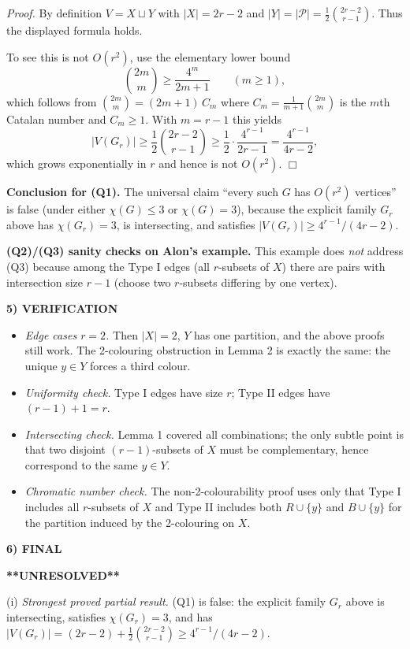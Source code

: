 \noindent\emph{Proof.}
By definition $V=X\sqcup Y$ with $|X|=2r-2$ and $|Y|=|\mathcal P|=\frac12\binom{2r-2}{r-1}$.
Thus the displayed formula holds.

To see this is not $O(r^2)$, use the elementary lower bound
\[
\binom{2m}{m}\ge \frac{4^m}{2m+1}\qquad(m\ge 1),
\]
which follows from $\binom{2m}{m}=(2m+1)\,C_m$ where $C_m=\frac{1}{m+1}\binom{2m}{m}$ is the $m$th Catalan number and $C_m\ge 1$.
With $m=r-1$ this yields
\[
|V(G_r)|\ge \frac12\binom{2r-2}{r-1}\ge \frac12\cdot \frac{4^{r-1}}{2r-1}=\frac{4^{r-1}}{4r-2},
\]
which grows exponentially in $r$ and hence is not $O(r^2)$. \hfill$\Box$

\medskip
\noindent\textbf{Conclusion for (Q1).}
The universal claim ``every such $G$ has $O(r^2)$ vertices'' is false (under either $\chi(G)\le 3$ or $\chi(G)=3$), because the explicit family $G_r$ above has $\chi(G_r)=3$, is intersecting, and satisfies $|V(G_r)|\ge 4^{r-1}/(4r-2)$.

\medskip
\noindent\textbf{(Q2)/(Q3) sanity checks on Alon's example.}
This example does \emph{not} address (Q3) because among the Type I edges (all $r$-subsets of $X$) there are pairs with intersection size $r-1$ (choose two $r$-subsets differing by one vertex).

\medskip
\noindent\textbf{5) VERIFICATION}

\begin{itemize}
\item \emph{Edge cases $r=2$.} Then $|X|=2$, $Y$ has one partition, and the above proofs still work. The 2-colouring obstruction in Lemma 2 is exactly the same: the unique $y\in Y$ forces a third colour.
\item \emph{Uniformity check.} Type I edges have size $r$; Type II edges have $(r-1)+1=r$.
\item \emph{Intersecting check.} Lemma 1 covered all combinations; the only subtle point is that two disjoint $(r-1)$-subsets of $X$ must be complementary, hence correspond to the same $y\in Y$.
\item \emph{Chromatic number check.} The non-2-colourability proof uses only that Type I includes all $r$-subsets of $X$ and Type II includes both $R\cup\{y\}$ and $B\cup\{y\}$ for the partition induced by the 2-colouring on $X$.
\end{itemize}

\medskip
\noindent\textbf{6) FINAL}

\textbf{**UNRESOLVED**}

(i) \emph{Strongest proved partial result.} (Q1) is false: the explicit family $G_r$ above is intersecting, satisfies $\chi(G_r)=3$, and has $|V(G_r)|=(2r-2)+\frac12\binom{2r-2}{r-1}\ge 4^{r-1}/(4r-2)$.

